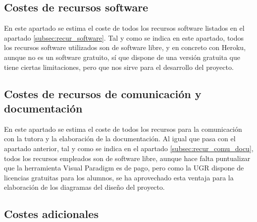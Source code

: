 \begin{table}[h]
\centering
{}
\caption{Costes asociados a los recursos materiales}
\label{tab:coste_recur_materiales}
\end{table}

\subsection{Costes de recursos software}

En este apartado se estima el coste de todos los recursos software listados en el apartado \ref{subsec:recur_software}. Tal y como se indica en este apartado, todos los recursos software utilizados son de software libre, y en concreto con Heroku, aunque no es un software gratuito, sí que dispone de una versión gratuita que tiene ciertas limitaciones, pero que nos sirve para el desarrollo del proyecto.

\subsection{Costes de recursos de comunicación y documentación}

En este apartado se estima el coste de todos los recursos para la comunicación con la tutora y la elaboración de la documentación. Al igual que pasa con el apartado anterior, tal y como se indica en el apartado \ref{subsec:recur_comu_docu}, todos los recursos empleados son de software libre, aunque hace falta puntualizar que la herramienta Visual Paradigm es de pago, pero como la UGR dispone de licencias gratuitas para los alumnos, se ha aprovechado esta ventaja para la elaboración de los diagramas del diseño del proyecto.

\subsection{Costes adicionales}

